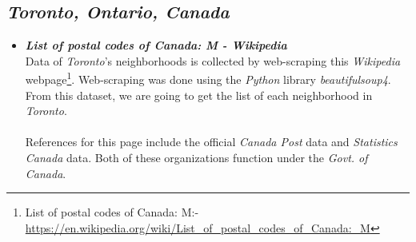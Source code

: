 \documentclass{article}
\begin{document}
\subsection{\textit{Toronto, Ontario, Canada}}
\begin{itemize}
    \item \textbf{\textit{List of postal codes of Canada: M - Wikipedia}}\\{Data of \textit{Toronto}'s neighborhoods is collected by web-scraping this \textit{Wikipedia} webpage\footnote{List of postal codes of Canada: M:- \url{https://en.wikipedia.org/wiki/List_of_postal_codes_of_Canada:_M}}. Web-scraping was done using the \textit{Python} library \textit{beautifulsoup4}. From this dataset, we are going to get the list of each neighborhood in \textit{Toronto}. }\\\\{References for this page include the official \textit{Canada Post} data and \textit{Statistics Canada} data. Both of these organizations function under the \textit{Govt. of Canada}.}
\end{itemize}
\end{document}
